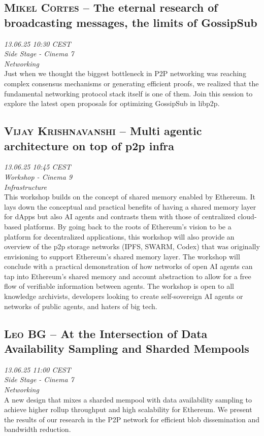 \clearpage
\subsection {\textsc{Mikel Cortes}  -- The eternal research of broadcasting messages, the limits of GossipSub} \noindent \textit {13.06.25 10:30 CEST\\ Side Stage - Cinema 7\\ Networking}\\[1em] Just when we thought the biggest bottleneck in P2P networking was reaching complex consensus mechanisms or generating efficient proofs, we realized that the fundamental networking protocol stack itself is one of them. Join this session to explore the latest open proposals for optimizing GossipSub in libp2p.

\clearpage
\subsection {\textsc{Vijay Krishnavanshi}  -- Multi agentic architecture on top of p2p infra} \noindent \textit {13.06.25 10:45 CEST\\ Workshop - Cinema 9\\ Infrastructure}\\[1em] This workshop builds on the concept of shared memory enabled by Ethereum. It lays down the conceptual and practical benefits of having a shared memory layer for dApps but also AI agents and contrasts them with those of centralized cloud-based platforms. By going back to the roots of Ethereum's vision to be a platform for decentralized applications, this workshop will also provide an overview of the p2p storage networks (IPFS, SWARM, Codex) that was originally envisioning to support Ethereum's shared memory layer. The workshop will conclude with a practical demonstration of how networks of open AI agents can tap into Ethereum's shared memory and account abstraction to allow for a free flow of verifiable information between agents. 
The workshop is open to all knowledge archivists, developers looking to create self-sovereign AI agents or networks of public agents, and haters of big tech.

\clearpage
\subsection {\textsc{Leo BG}  -- At the Intersection of Data Availability Sampling and Sharded Mempools} \noindent \textit {13.06.25 11:00 CEST\\ Side Stage - Cinema 7\\ Networking}\\[1em] A new design that mixes a sharded mempool with data availability sampling to achieve higher rollup throughput and high scalability for Ethereum. We present the results of our research in the P2P network for efficient blob dissemination and bandwidth reduction.

